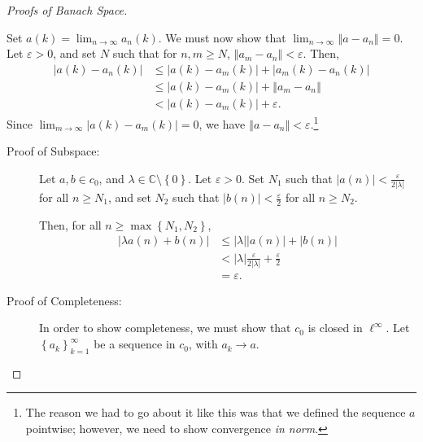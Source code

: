 \documentclass[12pt]{extarticle}
\newcommand{\C}{\mathbb{C}}
\newcommand{\norm}[1]{\left\Vert #1\right\Vert}
\newcommand{\set}[1]{\left\{#1\right\}}
\newcommand{\ve}{\varepsilon}
\theoremstyle{plain}
\theoremstyle{definition}
\theoremstyle{note}
\renewcommand{\newline}{\hfill\break}
\begin{document}
\begin{proof}[Proofs of Banach Space]
\begin{description}[font = \normalfont]
\begin{description}
          Set $a(k) = \lim_{n\rightarrow\infty}a_n(k)$. We must now show that $\lim_{n\rightarrow\infty}\norm{a - a_n} = 0$. Let $\ve > 0$, and set $N$ such that for $n,m\geq N$, $\norm{a_m - a_n} < \ve$. Then,
          \begin{align*}
            \left\vert a(k) - a_n(k) \right\vert &\leq \left\vert a(k) - a_m(k) \right\vert + \left\vert a_m(k) - a_n(k) \right\vert\\
                                                 &\leq \left\vert a(k) - a_m(k) \right\vert + \norm{a_m - a_n}\\
                                                 &< \left\vert a(k) - a_m(k) \right\vert + \ve.
          \end{align*}
          Since $\lim_{m\rightarrow\infty} \left\vert a(k) - a_m(k) \right\vert = 0$, we have $\norm{a - a_n} < \ve$.\footnote{The reason we had to go about it like this was that we defined the sequence $a$ pointwise; however, we need to show convergence \textit{in norm}.}
      \end{description}
    \item[$c_0$:]\hfill
      \begin{description}
        \item[Proof of Subspace:] Let $a,b\in c_0$, and $\lambda \in \C\setminus \set{0}$. Let $\ve > 0$. Set $N_1$ such that $|a(n)| < \frac{\ve}{2|\lambda|}$ for all $n\geq N_1$, and set $N_2$ such that $|b(n)| < \frac{\ve}{2}$ for all $n \geq N_2$.\newline

          Then, for all $n \geq \max\set{N_1,N_2}$,
          \begin{align*}
            |\lambda a(n) + b(n)| &\leq |\lambda||a(n)| + |b(n)|\\
                                  &< |\lambda|\frac{\ve}{2|\lambda|} + \frac{\ve}{2}\\
                                  &= \ve.
          \end{align*}
        \item[Proof of Completeness:] In order to show completeness, we must show that $c_0$ is closed in $\ell^{\infty}$. Let $\set{a_k}_{k=1}^{\infty}$ be a sequence in $c_0$, with $a_k \rightarrow a$.\newline


\end{description}
\end{description}
\end{proof}
\end{document}
